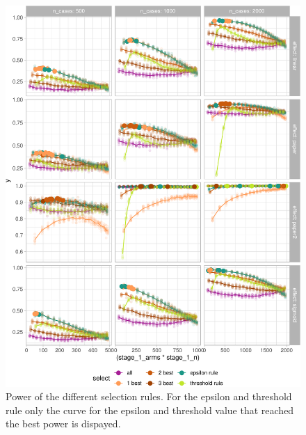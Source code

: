 \documentclass[bimj,fleqn]{w-art}
\theoremstyle{plain}
\theoremstyle{definition}
\begin{document}
\begin{figure}[htb]
\begin{center}
\includegraphics[width=\linewidth]{generated/figures/plot_allbest.pdf}
\caption{Power of the different selection rules. For the epsilon and threshold rule only the curve for the epsilon and threshold value that reached the best power is dispayed.}
\end{center}
\end{figure}
\end{document}
